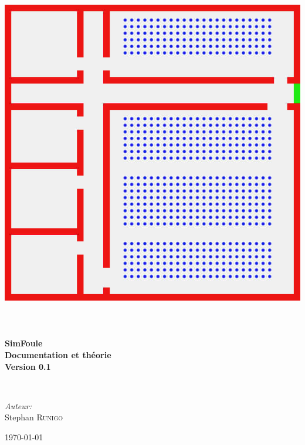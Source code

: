 \begin{titlepage}
\begin{center}

\includegraphics[width=.55\textwidth]{./titre/SimFoule0102}
\label{fig:image1}
~\\[1cm]

\textsc{\Large }\\[0.5cm]

\HRule \\[0.4cm]

{\huge \bfseries  SimFoule\\[0.2cm] 
Documentation et théorie\\[0.2cm] 
Version 0.1\\[0.4cm] }

\HRule \\[1.5cm]

\begin{minipage}{0.4\textwidth}
\begin{flushleft} \large
\end{flushleft}
\end{minipage}
\begin{minipage}{0.4\textwidth}
\begin{flushright} \large
\emph{Auteur:}\\
Stephan \textsc{Runigo}
\end{flushright}
\end{minipage}

\vfill

{\large \today}

\end{center}
\end{titlepage}
